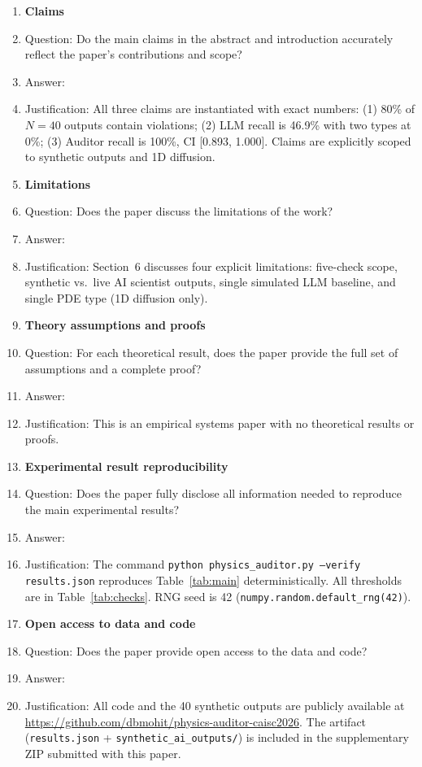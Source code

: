\documentclass{article}
\begin{document}
\begin{enumerate}

\item \textbf{Claims}
  \item[] Question: Do the main claims in the abstract and introduction
    accurately reflect the paper's contributions and scope?
  \item[] Answer: \answerYes{}
  \item[] Justification: All three claims are instantiated with exact numbers:
    (1) 80\% of $N=40$ outputs contain violations; (2) LLM recall is 46.9\%
    with two types at 0\%; (3) Auditor recall is 100\%, CI [0.893, 1.000].
    Claims are explicitly scoped to synthetic outputs and 1D diffusion.

\item \textbf{Limitations}
  \item[] Question: Does the paper discuss the limitations of the work?
  \item[] Answer: \answerYes{}
  \item[] Justification: Section~6 discusses four explicit limitations:
    five-check scope, synthetic vs.\ live AI scientist outputs, single
    simulated LLM baseline, and single PDE type (1D diffusion only).

\item \textbf{Theory assumptions and proofs}
  \item[] Question: For each theoretical result, does the paper provide
    the full set of assumptions and a complete proof?
  \item[] Answer: \answerNA{}
  \item[] Justification: This is an empirical systems paper with no
    theoretical results or proofs.

\item \textbf{Experimental result reproducibility}
  \item[] Question: Does the paper fully disclose all information needed to
    reproduce the main experimental results?
  \item[] Answer: \answerYes{}
  \item[] Justification: The command
    \texttt{python physics\_auditor.py --verify results.json}
    reproduces Table~\ref{tab:main} deterministically.
    All thresholds are in Table~\ref{tab:checks}.
    RNG seed is 42 (\texttt{numpy.random.default\_rng(42)}).

\item \textbf{Open access to data and code}
  \item[] Question: Does the paper provide open access to the data and code?
  \item[] Answer: \answerYes{}
  \item[] Justification: All code and the 40 synthetic outputs are publicly
    available at \url{https://github.com/dbmohit/physics-auditor-caisc2026}.
    The artifact (\texttt{results.json} + \texttt{synthetic\_ai\_outputs/})
    is included in the supplementary ZIP submitted with this paper.


\end{enumerate}
\end{document}
